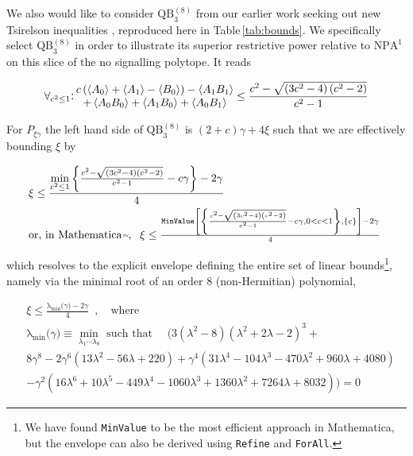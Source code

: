 \documentclass[
  12pt          %
  ,letterpaper  %
  ,center       %
  ,noupper      %
  ,english,fleqn]{uconnthesis}
\newcommand{\LeftEqns}[1]{\begin{fleqn}[\leftmargini minus \leftmargini]\begin{align}#1\end{align}\end{fleqn}}
\newcommand{\tab}[1]{Table\,\ref{#1}}
\begin{document}
We also would like to consider $\mbox{QB}_3^{(8)}$ from our earlier work seeking out new Tsirelson inequalities \cite{WolfeQB}, reproduced here in \tab{tab:bounds}. We specifically select $\mbox{QB}_3^{(8)}$ in order to illustrate its superior restrictive power relative to $\mbox{NPA}^1$ on this slice of the no signalling \gls{polytope}. It reads
\LeftEqns{\label{eq:qb3reproduced}
\forall_{c^2 \leq 1}\mathlarger{:}\, \begin{matrix}c\left( \left\langle A_0\right\rangle +\left\langle A_1\right\rangle -\left\langle B_0\right\rangle\right) -\left\langle A_1 B_1\right\rangle
\\ +\left\langle A_0 B_0\right\rangle +\left\langle A_1 B_0\right\rangle +\left\langle A_0 B_1\right\rangle \end{matrix} \leq \frac{c^2-\sqrt{\left(3 c^2-4\right) \left(c^2-2\right)}}{c^2-1}
}
For $P_{\xi\gamma}$ the left hand side of $\mbox{QB}_3^{(8)}$ is $(2+c)\gamma+4\xi$ such that we are effectively bounding $\xi$ by 
\LeftEqns{\label{eq:qb3forall}
&\xi\leq \frac{\min\limits_{c^2 \leq 1}{\bigg\lbrace{\frac{c^2-\sqrt{\left(3 c^2-4\right) \left(c^2-2\right)}}{c^2-1}-c \gamma\bigg\rbrace}}-2\gamma}{4}
\\\nonumber&\text{or, in Mathematica{\it\tiny\texttrademark},}\,\;\mbox{
\texttt{$\xi\leq \frac{\text{MinValue}\left[\left\{\frac{c^2-\sqrt{\left(3 c^2-4\right) \left(c^2-2\right)}}{c^2-1}-c \gamma ,0<c<1\right\},\{c\}\right]-2\gamma}{4}$}
}
}
which resolves to the explicit envelope defining the entire set of linear bounds\footnote{We have found \texttt{MinValue} to be the most efficient approach in Mathematica{\it\tiny\texttrademark}, but the envelope can also be derived using \texttt{Refine} and \texttt{ForAll}.}, namely via the minimal root of an order 8 (non-Hermitian) polynomial, 
\LeftEqns{\label{eq:envelope}
&\xi \leq \frac{\operatorname{\lambda_{\min}}{\big(\gamma\big)}-2\gamma}{4}\,\,\,,\,\,\,\,\text{ where}
\\\nonumber&\operatorname{\lambda_{min}}{\big(\gamma\big)} \equiv \min\limits_{\lambda_1\cdots\lambda_8}\text{ such that }\quad\Bigg(3 \left(\lambda ^2-8\right) \left(\lambda ^2+2 \lambda -2\right)^3+
\\\nonumber&
8 \gamma ^8-2 \gamma ^6 \left(13 \lambda ^2-56 \lambda +220\right)+\gamma ^4 \left(31 \lambda ^4-104 \lambda ^3-470 \lambda ^2+960 \lambda +4080\right)
\\\nonumber&-\gamma ^2 \left(16 \lambda ^6+10 \lambda ^5-449 \lambda ^4-1060 \lambda ^3+1360 \lambda ^2+7264 \lambda +8032\right)\Bigg)=0
}
\end{document}
